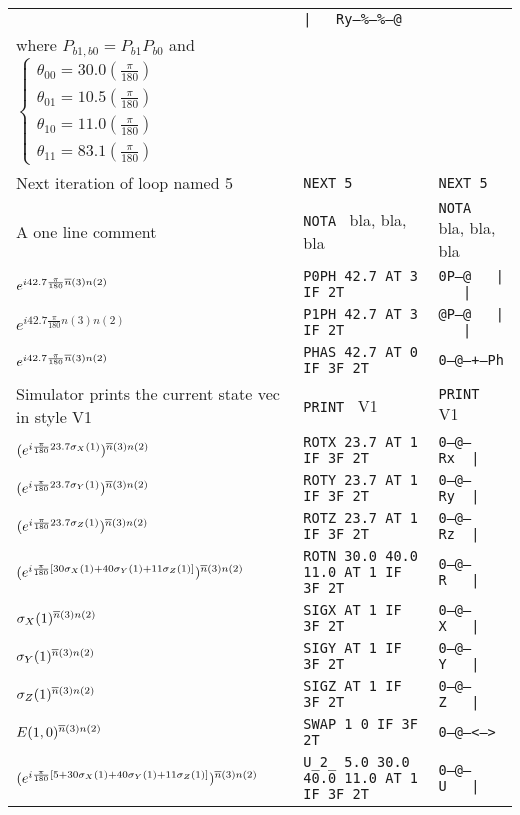 \documentclass[10pt]{article}
\begin{document}
\begin{center}
\begin{tabular}{|l|l|l|}
& {\tt |\ \ \ Ry--\%---\%---@}
\\
\footnotesize{where $P_{b1,b0}=P_{b1}P_{b0}$ and} $\left\{\begin{array}{l}
\theta_{00}=30.0(\frac{\pi}{180})
\\
\theta_{01}=10.5(\frac{\pi}{180})
\\
\theta_{10}=11.0(\frac{\pi}{180})
\\
\theta_{11}=83.1(\frac{\pi}{180})
\end{array}\right.$
&&
\\
\hline
Next iteration of loop named 5&
{\tt  NEXT 5}&{\tt  NEXT 5}
\\
\hline
A one line comment &
{\tt  NOTA } bla, bla, bla&{\tt  NOTA } bla, bla, bla
\\
\hline
$e^{i 42.7 \frac{\pi}{180} { \overline{n} }(3)n(2)}$ &
{\tt  P0PH 42.7 AT  3 IF 2T}&{\tt 0P--@\ \ \ |\ \ \ |}
\\
\hline
$e^{i 42.7 \frac{\pi}{180} n(3)n(2)}$ &
{\tt  P1PH 42.7 AT  3 IF 2T}&{\tt @P--@\ \ \ |\ \ \ |}
\\
\hline
$e^{i 42.7 \frac{\pi}{180} { \overline{n} }(3)n(2)}$ &
{\tt  PHAS 42.7 AT 0 IF  3F  2T}&{\tt 0---@---+--Ph}
\\
\hline
\footnotesize{Simulator prints the current state vec in style V1} &
{\tt  PRINT } V1&{\tt  PRINT } V1
\\
\hline
$(e^{i\frac{\pi}{180} 23.7 { \sigma_X}(1)})^{{ \overline{n} }(3)n(2)}$ &
{\tt  ROTX  23.7  AT  1  IF  3F  2T}&{\tt 0---@---Rx\ \ |}
\\
\hline
$(e^{i  \frac{\pi}{180} 23.7 { \sigma_Y}(1)})^{{ \overline{n} }(3)n(2)}$ &
{\tt  ROTY  23.7  AT  1  IF  3F  2T} &{\tt 0---@---Ry\ \ |}
\\
\hline
$(e^{i \frac{\pi}{180} 23.7 { \sigma_Z}(1)})^{{ \overline{n} }(3)n(2)}$ &
{\tt  ROTZ  23.7  AT  1  IF  3F  2T}&{\tt 0---@---Rz\ \ |}
\\
\hline
$(e^{
i  \frac{\pi}{180}
[30{ \sigma_X}(1)+ 40{ \sigma_Y}(1) + 11 { \sigma_Z}(1)]
 })^{{ \overline{n} }(3)n(2)}$ &
{\tt  ROTN  30.0 40.0 11.0  AT  1  IF  3F  2T}&{\tt 0---@---R\ \ \ |}
\\
\hline
${ \sigma_X}(1)^{{ \overline{n} }(3)n(2)}$ &
{\tt  SIGX  AT  1  IF  3F  2T}&{\tt 0---@---X\ \ \ |}
\\
\hline
${ \sigma_Y}(1)^{{ \overline{n} }(3)n(2)}$ &
{\tt  SIGY  AT  1  IF  3F  2T}&{\tt 0---@---Y\ \ \ |}
\\
\hline
${ \sigma_Z}(1)^{{ \overline{n} }(3)n(2)}$ &
{\tt  SIGZ  AT  1  IF  3F  2T}&{\tt 0---@---Z\ \ \ |}
\\
\hline
$E(1,0)^{{ \overline{n} }(3)n(2)}$ &
{\tt SWAP  1  0  IF  3F  2T}&{\tt 0---@---<--->}
\\
\hline
$(e^{
i  \frac{\pi}{180}
[5 + 30{ \sigma_X}(1)+ 40{ \sigma_Y}(1) + 11 { \sigma_Z}(1)]
 })^{{ \overline{n} }(3)n(2)}$ &
\scriptsize{{\tt  U\_2\_  5.0 30.0 40.0 11.0  AT  1  IF  3F  2T}}&
{\tt 0---@---U\ \ \ |}
\\
\hline
\end{tabular}
\end{center}
\end{document}
